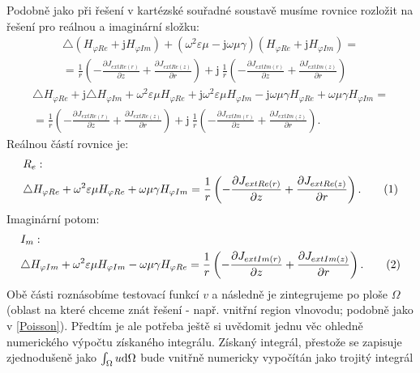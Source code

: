 \documentclass[12pt,a4paper,oneside]{article}
\numberwithin{equation}{section} %
\numberwithin{figure}{section} %
\numberwithin{table}{section} %
\newcommand{\mj}{\mathrm{j}} %
\newcommand\numberthis{\addtocounter{equation}{1}\tag{\theequation}}
\begin{document}
Podobně jako při řešení v kartézské souřadné soustavě musíme rovnice rozložit na řešení pro reálnou a imaginární složku:
\begin{equation}
\begin{split}
\triangle (H _{\varphi Re} + \mj H _{\varphi Im}) + (\omega ^2 \varepsilon \mu - \mj \omega \mu \gamma) (H _{\varphi Re} + \mj H _{\varphi Im}) =\\ 
= \frac{1}{r} \left( - \frac{\partial J _{extRe(r)}}{\partial z} + \frac{\partial J _{extRe(z)}}{\partial r} \right) + \mj ~ \frac{1}{r} \left( - \frac{\partial J _{extIm(r)}}{\partial z} + \frac{\partial J _{extIm(z)}}{\partial r} \right)
\end{split}
\end{equation}
\begin{equation}
\begin{split}
\triangle H _{\varphi Re} + \mj \triangle H _{\varphi Im} + \omega ^2 \varepsilon \mu H_ {\varphi Re} + \mj \omega ^2 \varepsilon \mu H _{\varphi Im} - \mj \omega \mu \gamma H _{\varphi Re} + \omega \mu \gamma H _{\varphi Im} =\\
= \frac{1}{r} \left( - \frac{\partial J _{extRe(r)}}{\partial z} + \frac{\partial J _{extRe(z)}}{\partial r} \right) + \mj ~ \frac{1}{r} \left( - \frac{\partial J _{extIm(r)}}{\partial z} + \frac{\partial J _{extIm(z)}}{\partial r} \right) .
\end{split}
\end{equation}
Reálnou částí rovnice je:
\begin{align*}
&R_{e}:
\\
&\triangle H_ {\varphi Re} + \omega ^2 \varepsilon \mu H_ {\varphi Re} + \omega \mu \gamma H _{\varphi Im} = \frac{1}{r} \left( - \frac{\partial J _{extRe(r)}}{\partial z} + \frac{\partial J _{extRe(z)}}{\partial r} \right) .
\numberthis
\end{align*}
Imaginární potom:
\begin{align*}
&I_{m}:
\\
&\triangle H _{\varphi Im} + \omega ^2 \varepsilon \mu H _{\varphi Im} - \omega \mu \gamma H _{\varphi Re} = \frac{1}{r} \left( - \frac{\partial J _{extIm(r)}}{\partial z} + \frac{\partial J _{extIm(z)}}{\partial r} \right) .
\numberthis
\end{align*}
Obě části roznásobíme testovací funkcí $v$ a následně je  zintegrujeme po ploše $\Omega$ (oblast na které chceme znát řešení - např. vnitřní region vlnovodu; podobně jako v \ref{Poisson}). Předtím je ale potřeba ještě si uvědomit jednu věc ohledně numerického výpočtu získaného integrálu. Získaný integrál, přestože se zapisuje zjednodušeně jako $\int _{\Omega} u \mathrm{d} \Omega$ bude vnitřně numericky vypočítán jako trojitý integrál 
\end{document}
